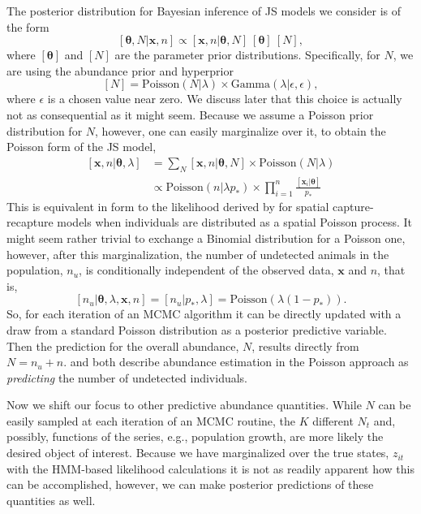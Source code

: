 \documentclass[12pt]{article}
\newcommand{\bx}{\ensuremath{\mathbf{x}}}
\newcommand{\bt}{\ensuremath{\boldsymbol{\theta}}}
\begin{document}
The posterior distribution for Bayesian inference of JS models we consider is of the form
\[
[\bt, N|\bx, n] \propto [\bx,n|\bt,N]\ [\bt]\ [N],
\]
where $[\bt]$ and $[N]$ are the parameter prior distributions. Specifically, for $N$, we are using the abundance prior and hyperprior
\[
[N] = \text{Poisson}(N|\lambda)\times  \text{Gamma}(\lambda|\epsilon, \epsilon),
\]
where $\epsilon$ is a chosen value near zero. We discuss later that this choice is actually not as consequential as it might seem. Because we assume a Poisson prior distribution for $N$, however, one can easily marginalize over it, to obtain the Poisson form of the JS model,
\begin{equation}
\begin{aligned}
[\bx, n|\bt, \lambda] &= \sum_N[\bx, n|\bt, N]\times \text{Poisson}(N|\lambda) \\
&\propto \text{Poisson}(n|\lambda p_*) \times \prod_{i=1}^n \frac{[\bx_i|\bt]}{p_*}
\end{aligned}
\end{equation}
This is equivalent in form to the likelihood derived by \cite{glennie2019open} for spatial capture-recapture models when individuals are distributed as a spatial Poisson process. It might seem rather trivial to exchange a Binomial distribution for a Poisson one, however, after this marginalization, the number of undetected animals in the population, $n_u$, is conditionally independent of the observed data, $\bx$ and $n$, that is, 
\[
[n_u|\bt, \lambda, \bx, n] = [n_u|p_*, \lambda] = \text{Poisson}(\lambda(1-p_*)).
\]
So, for each iteration of an MCMC algorithm it can be directly updated with a draw from a standard Poisson distribution as a posterior predictive variable. Then the prediction for the overall abundance, $N$, results directly from $N = n_u + n$. \cite{schofield2023estimating} and \cite{johnson2010model} both describe abundance estimation in the Poisson approach as {\it predicting} the number of undetected individuals. 

Now we shift our focus to other predictive abundance quantities. While $N$ can be easily sampled at each iteration of an MCMC routine, the $K$ different $N_t$ and, possibly, functions of the series, e.g., population growth, are more likely the desired object of interest. Because we have marginalized over the true states, $z_{it}$ with the HMM-based likelihood calculations it is not as readily apparent how this can be accomplished, however, we can make posterior predictions of these quantities as well. 
\end{document}
